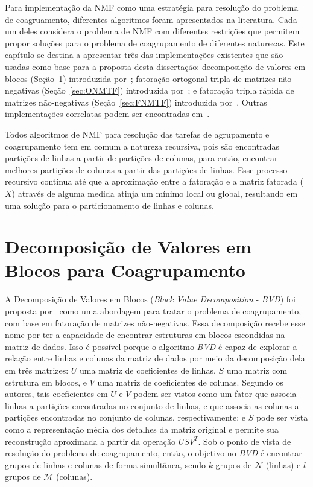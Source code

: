 \documentclass[
    12pt,                %
    oneside,            %
    a4paper,            %
    english,            %
    brazil                %
    ]{abntex2ppgsi}
\begin{document}
Para implementação da NMF como uma estratégia para resolução do problema de coagruamento, diferentes algoritmos foram apresentados na literatura.
Cada um deles considera o problema de NMF com diferentes restrições que permitem propor soluções para o problema de coagrupamento de diferentes naturezas.
Este capítulo se destina a apresentar três das implementações existentes que são usadas como base para a proposta desta dissertação: decomposição de valores em blocos (Seção~\ref{sec:bvd}) introduzida por~; fatoração ortogonal tripla de matrizes não-negativas (Seção~\ref{sec:ONMTF}) introduzida por~; e fatoração tripla rápida de matrizes não-negativas (Seção~\ref{sec:FNMTF}) introduzida por~.
Outras implementações correlatas podem ser encontradas em~\cite{Li2006}.

Todos algoritmos de NMF para resolução das tarefas de agrupamento e coagrupamento tem em comum a natureza recursiva, pois são encontradas partições de linhas a partir de partições de colunas, para então, encontrar melhores partições de colunas a partir das partições de linhas.
Esse processo recursivo continua até que a aproximação entre a fatoração e a matriz fatorada ($X$) através de alguma medida atinja um mínimo local ou global, resultando em uma solução para o particionamento de linhas e colunas.

\section{Decomposição de Valores em Blocos para Coagrupamento}
\label{sec:bvd}

A Decomposição de Valores em Blocos (\textit{Block Value Decomposition} - \textit{BVD}) foi proposta por~ como uma abordagem para tratar o problema de coagrupamento, com base em fatoração de matrizes não-negativas.
Essa decomposição recebe esse nome por ter a capacidade de encontrar estruturas em blocos escondidas na matriz de dados.
Isso é possível porque o algoritmo \textit{BVD} é capaz de explorar a relação entre linhas e colunas da matriz de dados por meio da decomposição dela em três matrizes: $U$ uma matriz de coeficientes de linhas, $S$ uma matriz com estrutura em blocos, e $V$ uma matriz de coeficientes de colunas.
Segundo os autores, tais coeficientes em $U$ e $V$ podem ser vistos como um fator que associa linhas a partições encontradas no conjunto de linhas, e que associa as colunas a partições encontradas no conjunto de colunas, respectivamente; e $S$ pode ser vista como a representação média dos detalhes da matriz original e permite sua reconstrução aproximada a partir da operação $USV^T$.
Sob o ponto de vista de resolução do problema de coagrupamento, então, o objetivo no \textit{BVD} é encontrar grupos de linhas e colunas de forma simultânea, sendo $k$ grupos de $\mathcal{N}$ (linhas) e $l$ grupos de $\mathcal{M}$ (colunas).
\end{document}

